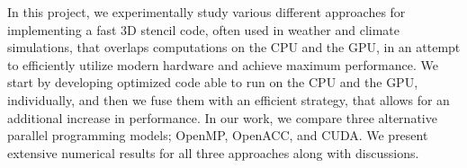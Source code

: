 
In this project, we experimentally study various different approaches for implementing a fast 3D stencil code, often used in weather and climate simulations, that overlaps computations on the CPU and the GPU, in an attempt to efficiently utilize modern hardware and achieve maximum performance.
We start by developing optimized code able to run on the CPU and the GPU, individually, and then we fuse them with an efficient strategy, that allows for an additional increase in performance. 
In our work, we compare three alternative parallel programming models; OpenMP, OpenACC, and CUDA.
We present extensive numerical results for all three approaches along with discussions.